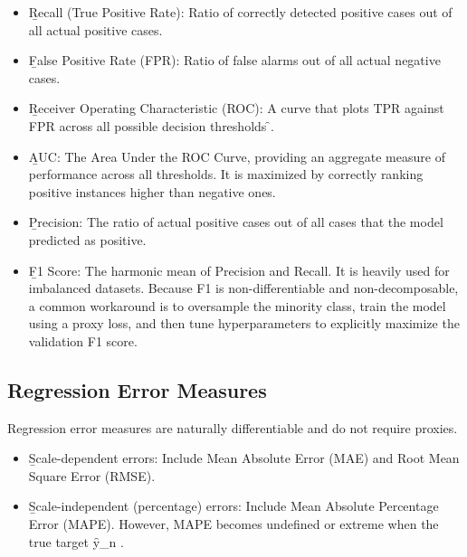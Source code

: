 \begin{itemize}
\item \b{Recall (True Positive Rate)}: Ratio of correctly detected positive cases out of all actual positive cases.
\item \b{False Positive Rate (FPR)}: Ratio of false alarms out of all actual negative cases.
\item \b{Receiver Operating Characteristic (ROC)}: A curve that plots TPR against FPR across all possible decision thresholds \f{\epsilon \in [0, 1]}.
\item \b{AUC}: The Area Under the ROC Curve, providing an aggregate measure of performance across all thresholds. It is maximized by correctly ranking positive instances higher than negative ones.
\item \b{Precision}: The ratio of actual positive cases out of all cases that the model predicted as positive.
\item \b{F1 Score}: The harmonic mean of Precision and Recall. It is heavily used for imbalanced datasets. Because F1 is non-differentiable and non-decomposable, a common workaround is to oversample the minority class, train the model using a proxy loss, and then tune hyperparameters to explicitly maximize the validation F1 score.
\end{itemize}
\vspace{1em}




\subsection{Regression Error Measures}
Regression error measures are naturally differentiable and do not require proxies.
\begin{itemize}
\item \b{Scale-dependent errors}: Include Mean Absolute Error (MAE) and Root Mean Square Error (RMSE).
\end{itemize}


\begin{itemize}
\item \b{Scale-independent (percentage) errors}: Include Mean Absolute Percentage Error (MAPE). However, MAPE becomes undefined or extreme when the true target \f{y_n }.
\end{itemize}


